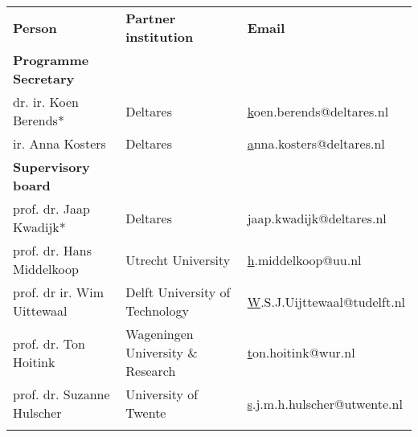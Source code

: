 \begin{longtable}{lll}
\rowcolor[HTML]{629194} 
{\color[HTML]{FFFFFF} \textbf{Person}} & {\color[HTML]{FFFFFF} \textbf{Partner   institution}} & {\color[HTML]{FFFFFF} \textbf{Email}}                        \\
\rowcolor[HTML]{C9D6D6} 
\textbf{Programme Secretary}           &                                                       &                                                              \\
\rowcolor[HTML]{B9C6D5} 
dr. ir. Koen Berends*                  & Deltares                                              & {\color[HTML]{0563C1} {\ul koen.berends@deltares.nl}}        \\
\rowcolor[HTML]{C9D6D6} 
ir. Anna Kosters                       & Deltares                                              & {\color[HTML]{0563C1} {\ul anna.kosters@deltares.nl}}        \\
\rowcolor[HTML]{B9C6D5} 
\textbf{Supervisory board}             &                                                       &                                                              \\
\rowcolor[HTML]{C9D6D6} 
prof. dr. Jaap Kwadijk*                & Deltares                                              & {\color[HTML]{0563C1} {\ul jaap.kwadijk@deltares.nl}}        \\
\rowcolor[HTML]{B9C6D5} 
prof. dr. Hans Middelkoop              & Utrecht University                                    & {\color[HTML]{0563C1} {\ul h.middelkoop@uu.nl}}              \\
\rowcolor[HTML]{C9D6D6} 
prof. dr ir. Wim Uittewaal             & Delft University of   Technology                      & {\color[HTML]{0563C1} {\ul W.S.J.Uijttewaal@tudelft.nl}}     \\
\rowcolor[HTML]{B9C6D5} 
prof. dr. Ton  Hoitink                 & Wageningen University   \& Research                   & {\color[HTML]{0563C1} {\ul ton.hoitink@wur.nl}}              \\
\rowcolor[HTML]{C9D6D6} 
prof. dr. Suzanne Hulscher             & University of Twente                                  & {\color[HTML]{0563C1} {\ul s.j.m.h.hulscher@utwente.nl}}     \\
\rowcolor[HTML]{B9C6D5} 

\end{longtable}
